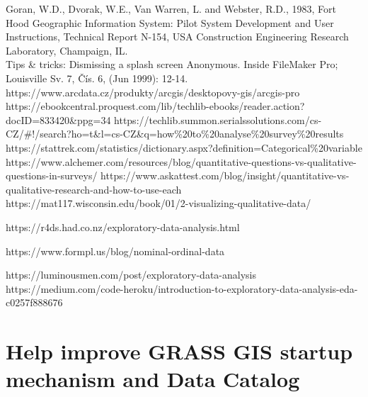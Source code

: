 \documentclass[a4paper,10pt,twoside]{article}
\begin{document}
\newpage
\vspace*{-6ex}
\renewcommand{\refname}{References} 
	
	

\noindent
\large



Goran, W.D., Dvorak, W.E., Van Warren, L. and Webster, R.D., 1983, Fort Hood Geographic Information System: Pilot System Development and User Instructions, Technical Report N-154, USA Construction Engineering Research Laboratory, Champaign, IL.\\

Tips \& tricks: Dismissing a splash screen Anonymous. Inside FileMaker Pro; Louisville Sv. 7, Čís. 6,  (Jun 1999): 12-14. \\

https://www.arcdata.cz/produkty/arcgis/desktopovy-gis/arcgis-pro \\

https://ebookcentral.proquest.com/lib/techlib-ebooks/reader.action?docID=833420\&ppg=34
https://techlib.summon.serialssolutions.com/cs-CZ/\#!/search?ho=t\&l=cs-CZ\&q=how\%20to\%20analyse\%20survey\%20results
https://stattrek.com/statistics/dictionary.aspx?definition=Categorical\%20variable
https://www.alchemer.com/resources/blog/quantitative-questions-vs-qualitative-questions-in-surveys/
https://www.askattest.com/blog/insight/quantitative-vs-qualitative-research-and-how-to-use-each
https://mat117.wisconsin.edu/book/01/2-visualizing-qualitative-data/

https://r4ds.had.co.nz/exploratory-data-analysis.html

https://www.formpl.us/blog/nominal-ordinal-data

https://luminousmen.com/post/exploratory-data-analysis
https://medium.com/code-heroku/introduction-to-exploratory-data-analysis-eda-c0257f888676

\newpage
\vspace*{-1cm}
\appendix
\section{Help improve GRASS GIS startup mechanism and Data Catalog }
\label{appendix:A}
\setcounter{page}{1} 
 
\end{document}
